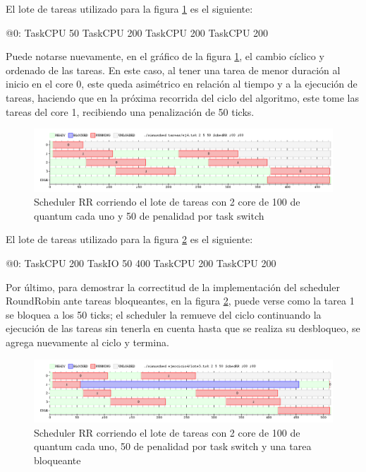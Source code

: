 \documentclass[a4paper,10pt,twoside]{article}
\newenvironment{pseudo}[1][]{%
    \vspace{0.5em}%
    \begin{algorithmic}%
}
{%
    \end{algorithmic}%
    \vspace{0.5em}%
}
\begin{document}
El lote de tareas utilizado para la figura \ref{SchedRR2Core} es el siguiente:
\begin{pseudo}
	\State @0:
	\State TaskCPU 50
	\State TaskCPU 200
	\State TaskCPU 200
	\State TaskCPU 200
\end{pseudo}

Puede notarse nuevamente, en el gráfico de la figura \ref{SchedRR2Core}, el cambio cíclico y ordenado de las tareas. En este caso, al tener una tarea de menor duración al inicio en el core 0, este queda asimétrico en relación al tiempo y a la ejecución de tareas, haciendo que en la próxima recorrida del ciclo del algoritmo, este tome las tareas del core 1, recibiendo una penalización de 50 ticks.

\begin{figure}[ht!]
\centering
\includegraphics[width=175mm]{../ejercicio4/SchedRR2Core.png}
\caption{Scheduler RR corriendo el lote de tareas con 2 core de 100 de quantum cada uno y 50 de penalidad por task switch}
\label{SchedRR2Core}
\end{figure}

El lote de tareas utilizado para la figura \ref{SchedRR2CoreIO} es el siguiente:
\begin{pseudo}
	\State @0:
	\State TaskCPU 200
	\State TaskIO 50 400
	\State TaskCPU 200
	\State TaskCPU 200
\end{pseudo}

Por último, para demostrar la correctitud de la implementación del scheduler RoundRobin ante tareas bloqueantes, en la figura \ref{SchedRR2CoreIO}, puede verse como la tarea 1 se bloquea a los 50 ticks; el scheduler la remueve del ciclo continuando la ejecución de las tareas sin tenerla en cuenta hasta que se realiza su desbloqueo, se agrega nuevamente al ciclo y termina.

\begin{figure}[ht!]
\centering
\includegraphics[width=175mm]{../ejercicio4/SchedRR2CoreIO.png}
\caption{Scheduler RR corriendo el lote de tareas con 2 core de 100 de quantum cada uno, 50 de penalidad por task switch y una tarea bloqueante}
\label{SchedRR2CoreIO}
\end{figure}
\end{document}
